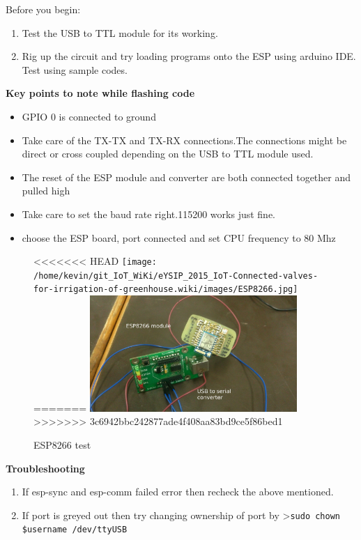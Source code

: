 \documentclass[16pt]{article}
\begin{document}
Before you begin:

\begin{enumerate}

\item
  Test the USB to TTL module for its working.
\item
  Rig up the circuit and try loading programs onto the ESP using arduino
  IDE. Test using sample codes.
\end{enumerate}



\textbf{Key points to note while flashing code}

\begin{itemize}

\item
  GPIO 0 is connected to ground
\item
  Take care of the TX-TX and TX-RX connections.The connections might be
  direct or cross coupled depending on the USB to TTL module used.
\item
  The reset of the ESP module and converter are both connected together
  and pulled high
\item
  Take care to set the baud rate right.115200 works just fine.
\item
  choose the ESP board, port connected and set CPU frequency to 80 Mhz
\end{itemize}

\begin{figure}
\hspace{2cm}
<<<<<<< HEAD
\texttt{[image: /home/kevin/git\_IoT\_WiKi/eYSIP\_2015\_IoT-Connected-valves-for-irrigation-of-greenhouse.wiki/images/ESP8266.jpg]}
=======
\includegraphics[width=0.7\textwidth]{images/ESP8266.jpg}
>>>>>>> 3c6942bbc242877ade4f408aa83bd9ce5f86bed1
\caption{ESP8266 test}
\end{figure}

\vspace{0.5cm}
{\Large{\textbf{Troubleshooting}}}

\begin{enumerate}

\item
  If esp-sync and esp-comm failed error then recheck the above
  mentioned.
\item
  If port is greyed out then try changing ownership of port by
  \textgreater{}\texttt{sudo chown \$username /dev/ttyUSB}
\end{enumerate}
\end{document}
